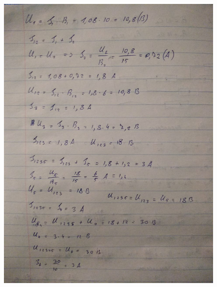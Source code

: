 \documentclass{article}
\begin{document}
\begin{normalsize}
	\begin{figure}[H]
		\centering
		\includegraphics[scale=0.4]{22}
	\end{figure}
	

\end{normalsize}
\end{document}
